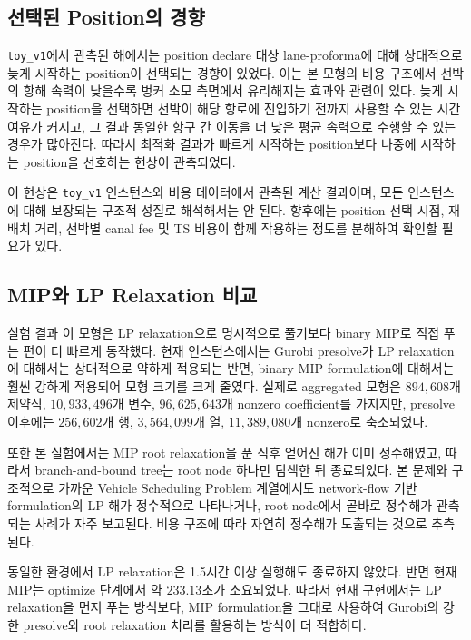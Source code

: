 \documentclass[11pt]{article}
\begin{document}
\subsection{선택된 Position의 경향}

\texttt{toy\_v1}에서 관측된 해에서는 position declare 대상 lane-proforma에 대해
상대적으로 늦게 시작하는 position이 선택되는 경향이 있었다. 이는 본 모형의 비용
구조에서 선박의 항해 속력이 낮을수록 벙커 소모 측면에서 유리해지는 효과와
관련이 있다. 늦게 시작하는 position을 선택하면 선박이 해당 항로에 진입하기
전까지 사용할 수 있는 시간 여유가 커지고, 그 결과 동일한 항구 간 이동을 더 낮은
평균 속력으로 수행할 수 있는 경우가 많아진다. 따라서 최적화 결과가 빠르게
시작하는 position보다 나중에 시작하는 position을 선호하는 현상이 관측되었다.

이 현상은 \texttt{toy\_v1} 인스턴스와 비용 데이터에서 관측된 계산 결과이며, 모든
인스턴스에 대해 보장되는 구조적 성질로 해석해서는 안 된다. 향후에는 position
선택 시점, 재배치 거리, 선박별 canal fee 및 TS 비용이 함께 작용하는 정도를
분해하여 확인할 필요가 있다.

\subsection{MIP와 LP Relaxation 비교}

실험 결과 이 모형은 LP relaxation으로 명시적으로 풀기보다 binary MIP로 직접
푸는 편이 더 빠르게 동작했다. 현재 인스턴스에서는 Gurobi presolve가 LP
relaxation에 대해서는 상대적으로 약하게 적용되는 반면, binary MIP formulation에
대해서는 훨씬 강하게 적용되어 모형 크기를 크게 줄였다. 실제로 aggregated
모형은 $894{,}608$개 제약식, $10{,}933{,}496$개 변수, $96{,}625{,}643$개
nonzero coefficient를 가지지만, presolve 이후에는 $256{,}602$개 행,
$3{,}564{,}099$개 열, $11{,}389{,}080$개 nonzero로 축소되었다.

또한 본 실험에서는 MIP root relaxation을 푼 직후 얻어진 해가 이미 정수해였고,
따라서 branch-and-bound tree는 root node 하나만 탐색한 뒤 종료되었다. 
본 문제와 구조적으로 가까운 Vehicle Scheduling Problem 계열에서도 network-flow
기반 formulation의 LP 해가 정수적으로 나타나거나, root node에서 곧바로 정수해가
관측되는 사례가 자주 보고된다. 비용 구조에 따라 자연히 정수해가 도출되는 것으로 추측된다.

동일한 환경에서 LP relaxation은 1.5시간 이상 실행해도 종료하지 않았다. 반면
현재 MIP는 optimize 단계에서 약 $233.13$초가 소요되었다. 따라서 현재
구현에서는 LP relaxation을 먼저 푸는 방식보다, MIP formulation을 그대로 사용하여
Gurobi의 강한 presolve와 root relaxation 처리를 활용하는 방식이 더 적합하다.
\end{document}
